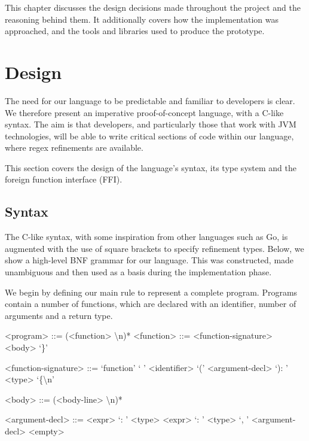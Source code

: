 \documentclass[a4paper,openany,12pt]{book}
\begin{document}
This chapter discusses the design decisions made throughout the project and the reasoning behind them.
It additionally covers how the implementation was approached, and the tools and libraries used to produce the prototype.

\section{Design}

The need for our language to be predictable and familiar to developers is clear.
We therefore present an imperative proof-of-concept language, with a C-like syntax.
The aim is that developers, and particularly those that work with JVM technologies, will be able to write critical
sections of code within our language, where regex refinements are available.

This section covers the design of the language's syntax, its type system and the foreign function interface (FFI).

\subsection{Syntax}

The C-like syntax, with some inspiration from other languages such as Go, is augmented with the use of square brackets
to specify refinement types.
Below, we show a high-level BNF grammar for our language.
This was constructed, made unambiguous and then used as a basis during the implementation phase.

\setlength{\grammarparsep}{20pt plus 1pt minus 1pt} %
\setlength{\grammarindent}{12em} %

We begin by defining our main rule to represent a complete program.
Programs contain a number of functions, which are declared with an identifier, number of arguments and a return type.

\begin{grammar}
    <program> ::= (<function> \textbackslash n)*
    <function> ::= <function-signature> <body> `\}'

    <function-signature> ::= `function' ` ' <identifier> `(' <argument-decl> `): ' <type> `\{\textbackslash n'

    <body> ::= (<body-line> \textbackslash n)*

    <argument-decl> ::= <expr> `: ' <type>
    \alt <expr> `: ' <type> `, ' <argument-decl>
    \alt <empty>
\end{grammar}
\end{document}
